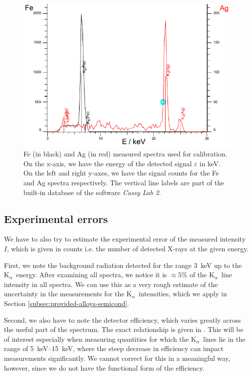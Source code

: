 \documentclass[11pt,a4paper,twoside,onecolumn]{article}
\newcommand{\Kalpha}{$\mathrm{K}_\alpha$~}
\begin{document}
\begin{figure}[!htbp]
    \centering
    \includegraphics[width=\textwidth]{img/calibration.pdf}
    \caption{Fe (in black) and Ag (in red) measured spectra used for calibration. On the x-axis, we have the energy of the detected signal $\varepsilon$ in \unit{keV}. On the left and right y-axes, we have the signal counts for the Fe and Ag spectra respectively. The vertical line labels are part of the built-in database of the software \emph{Cassy Lab 2}.}\label{fig:calibration}
\end{figure}

\subsection{Experimental errors}\label{subsec:experimental-errors}
We have to also try to estimate the experimental error of the measured intensity $I$, which is given in counts i.e. the number of detected X-rays at the given energy.

First, we note the background radiation detected for the range \qty{3}{keV} up to the \Kalpha energy. After examining all spectra, we notice it is $\approx 5\%$ of the \Kalpha line intensity in all spectra. We can use this as a very rough estimate of the uncertainty in the measurements for the \Kalpha intensities, which we apply in Section \ref{subsec:provided-alloys-semicond}.

Second, we also have to note the detector efficiency, which varies greatly across the useful part of the spectrum. The exact relationship is given in \cite[Section 3]{xRayManual}. This will be of interest especially when measuring quantities for which the \Kalpha lines lie in the range of \qtyrange{5}{15}{keV}, where the steep decrease in efficiency can impact measurements significantly. We cannot correct for this in a meaningful way, however, since we do not have the functional form of the efficiency.
\end{document}
